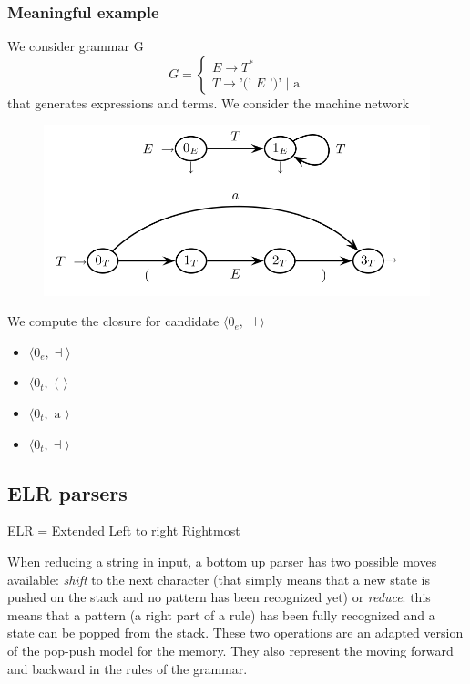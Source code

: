			\subsubsection{Meaningful example}
				We consider grammar G
				\begin{equation}
					G = 
					\begin{cases}
						E \rightarrow T^\ast\\
						T \rightarrow \text{'(' } E \text{ ')' } \vert \text{ a}
					\end{cases}
				\end{equation}
				that generates expressions and terms. We consider the machine network
				\begin{figure}[H]
					\begin{center}
						\includegraphics[width = \textwidth]{./images/exNetwork.png}
					\end{center}
				\end{figure}
				We compute the closure for candidate $\langle 0_e, \dashv \rangle$
				\begin{itemize}
					\item $\langle 0_e, \dashv \rangle$
					\item $\langle 0_t, \text{ ( }\rangle$
					\item $\langle 0_t, \text{ a }\rangle$
					\item $\langle 0_t, \dashv \rangle$
				\end{itemize}
		
		\subsection{ELR parsers}
			ELR = Extended Left to right Rightmost

			When reducing a string in input, a bottom up parser has two possible moves available: \emph{shift} to the next character (that simply means that a new 
			state is pushed on the stack and no pattern has been recognized yet) or \emph{reduce}: this means that a pattern (a right part of a rule) has been fully 
			recognized and a state can be popped from the stack. These two operations are an adapted version of the pop-push model for the memory. They also represent 
			the moving forward and backward in the rules of the grammar.

